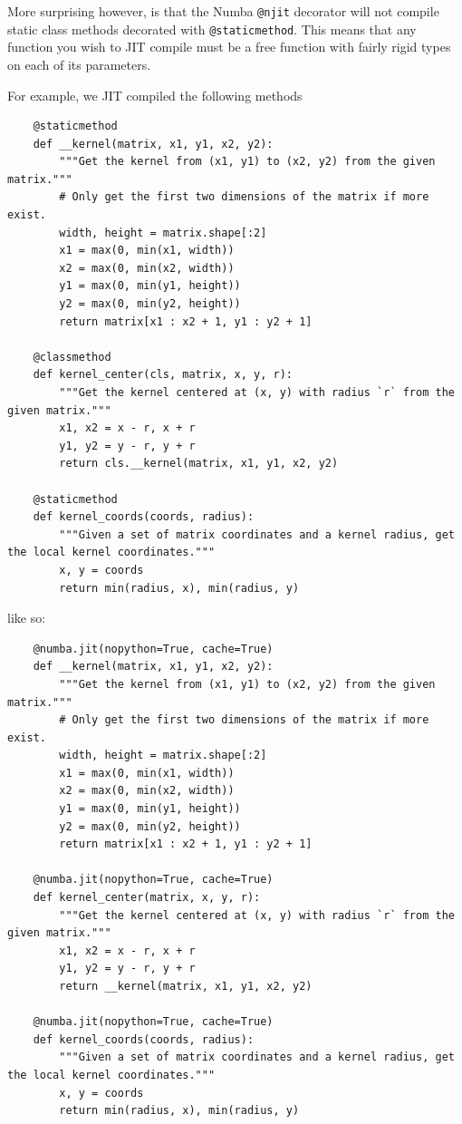 \documentclass[12pt]{article}
\begin{document}
More surprising however, is that the Numba \texttt{@njit} decorator will not compile static class methods decorated with \texttt{@staticmethod}.
This means that any function you wish to JIT compile must be a free function with fairly rigid types on each of its parameters.

For example, we JIT compiled the following methods
\begin{verbatim}
    @staticmethod
    def __kernel(matrix, x1, y1, x2, y2):
        """Get the kernel from (x1, y1) to (x2, y2) from the given matrix."""
        # Only get the first two dimensions of the matrix if more exist.
        width, height = matrix.shape[:2]
        x1 = max(0, min(x1, width))
        x2 = max(0, min(x2, width))
        y1 = max(0, min(y1, height))
        y2 = max(0, min(y2, height))
        return matrix[x1 : x2 + 1, y1 : y2 + 1]

    @classmethod
    def kernel_center(cls, matrix, x, y, r):
        """Get the kernel centered at (x, y) with radius `r` from the given matrix."""
        x1, x2 = x - r, x + r
        y1, y2 = y - r, y + r
        return cls.__kernel(matrix, x1, y1, x2, y2)

    @staticmethod
    def kernel_coords(coords, radius):
        """Given a set of matrix coordinates and a kernel radius, get the local kernel coordinates."""
        x, y = coords
        return min(radius, x), min(radius, y)
\end{verbatim}

like so:

\begin{verbatim}
    @numba.jit(nopython=True, cache=True)
    def __kernel(matrix, x1, y1, x2, y2):
        """Get the kernel from (x1, y1) to (x2, y2) from the given matrix."""
        # Only get the first two dimensions of the matrix if more exist.
        width, height = matrix.shape[:2]
        x1 = max(0, min(x1, width))
        x2 = max(0, min(x2, width))
        y1 = max(0, min(y1, height))
        y2 = max(0, min(y2, height))
        return matrix[x1 : x2 + 1, y1 : y2 + 1]

    @numba.jit(nopython=True, cache=True)
    def kernel_center(matrix, x, y, r):
        """Get the kernel centered at (x, y) with radius `r` from the given matrix."""
        x1, x2 = x - r, x + r
        y1, y2 = y - r, y + r
        return __kernel(matrix, x1, y1, x2, y2)

    @numba.jit(nopython=True, cache=True)
    def kernel_coords(coords, radius):
        """Given a set of matrix coordinates and a kernel radius, get the local kernel coordinates."""
        x, y = coords
        return min(radius, x), min(radius, y)
\end{verbatim}
\end{document}
